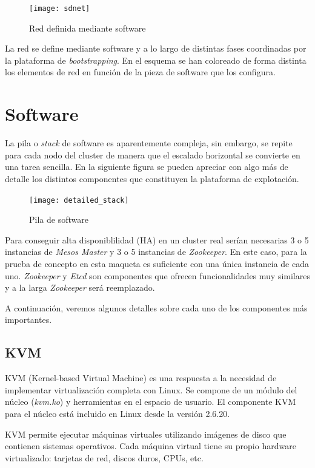 \documentclass[a4paper,12pt,spanish,final]{epsc_tfc_pfc}
\begin{document}
\begin{figure}[h]
  \centering
    \texttt{[image: sdnet]}
      \caption{Red definida mediante software}
\end{figure}

La red se define mediante software y a lo largo de distintas fases coordinadas por la plataforma de \emph{bootstrapping}. En el esquema se han coloreado de forma distinta los elementos de red en función de la pieza de software que los configura.

\section{Software}

La pila o \emph{stack} de software es aparentemente compleja, sin embargo, se repite para cada nodo del cluster de manera que el escalado horizontal se convierte en una tarea sencilla. En la siguiente figura se pueden apreciar con algo más de detalle los distintos componentes que constituyen la plataforma de explotación.

\begin{figure}[h]
  \centering
    \texttt{[image: detailed\_stack]}
      \caption{Pila de software}
\end{figure}

Para conseguir alta disponiblilidad (HA) en un cluster real serían necesarias 3 o 5 instancias de \emph{Mesos Master} y 3 o 5 instancias de \emph{Zookeeper}. En este caso, para la prueba de concepto en esta maqueta es suficiente con una única instancia de cada uno. \emph{Zookeeper} y \emph{Etcd} son componentes que ofrecen funcionalidades muy similares y a la larga \emph{Zookeeper} será reemplazado.

A continuación, veremos algunos detalles sobre cada uno de los componentes más importantes.

\subsection{KVM}

KVM (Kernel-based Virtual Machine) es una respuesta a la necesidad de implementar virtualización completa con Linux. Se compone de un módulo del núcleo (\emph{kvm.ko}) y herramientas en el espacio de usuario. El componente KVM para el núcleo está incluido en Linux desde la versión 2.6.20.

KVM permite ejecutar máquinas virtuales utilizando imágenes de disco que contienen sistemas operativos. Cada máquina virtual tiene su propio hardware virtualizado: tarjetas de red, discos duros, CPUs, etc.
\end{document}
